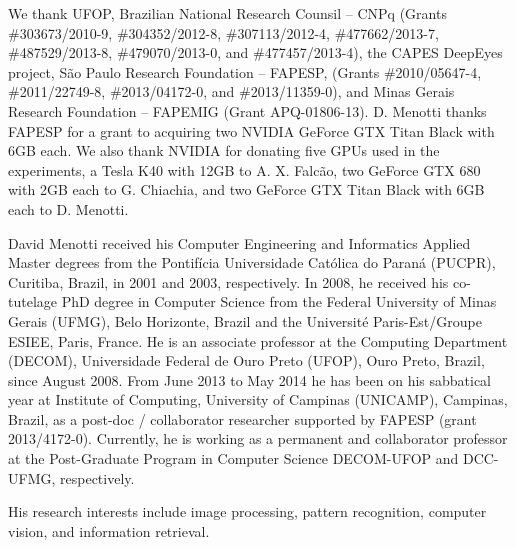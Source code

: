 \documentclass[journal]{IEEEtran}
\begin{document}
We thank UFOP, Brazilian National Research Counsil -- CNPq (Grants \#303673/2010-9,  \#304352/2012-8, \#307113/2012-4, \#477662/2013-7, \#487529/2013-8, \#479070/2013-0, and \#477457/2013-4), the CAPES DeepEyes project, S\~ao Paulo Research Foundation -- FAPESP, (Grants \#2010/05647-4, \#2011/22749-8, \#2013/04172-0, and \#2013/11359-0), and Minas Gerais Research Foundation -- FAPEMIG (Grant APQ-01806-13). 
D. Menotti thanks FAPESP for a grant to acquiring two NVIDIA GeForce GTX Titan Black with 6GB each.
We also thank NVIDIA for donating five GPUs used in the experiments, a Tesla K40 with 12GB to A. X. Falc{\~a}o, two GeForce GTX 680 with 2GB each to G. Chiachia, and two GeForce GTX Titan Black with 6GB each to D. Menotti.

\ifCLASSOPTIONcaptionsoff
  \newpage
\fi






\begin{IEEEbiography}{David Menotti} received his Computer Engineering and Informatics Applied Master degrees from the Pontif\'icia Universidade Cat\'olica do Paran\'a (PUCPR), Curitiba, Brazil, in 2001 and 2003, respectively.
In 2008, he received his co-tutelage PhD degree in Computer Science from the Federal University of Minas Gerais (UFMG), Belo Horizonte, Brazil and the Universit\'e Paris-Est/Groupe ESIEE, Paris, France.
He is an associate professor at the Computing Department (DECOM), Universidade Federal de Ouro Preto (UFOP), Ouro Preto, Brazil, since August 2008. 
From June 2013 to May 2014 he has been on his sabbatical year at Institute of Computing, University of Campinas (UNICAMP), Campinas, Brazil, as a post-doc / collaborator researcher supported by FAPESP (grant 2013/4172-0).
Currently, he is working as a permanent and collaborator professor at the Post-Graduate Program in Computer Science DECOM-UFOP and DCC-UFMG, respectively.

His research interests include image processing, pattern recognition, computer vision, and information retrieval.
\end{IEEEbiography}
\end{document}
